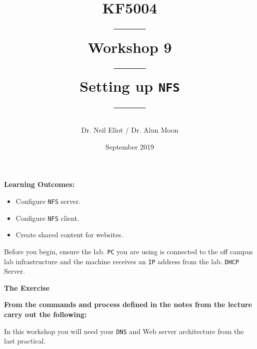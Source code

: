 \documentclass[11pt]{article}
\begin{document}
\author{Dr. Neil Eliot / Dr. Alun Moon}
\title{KF5004\\------\\Workshop 9\\------\\Setting up \texttt{NFS}\\------}
\date{September 2019}
\maketitle

\newpage



\noindent\textbf{Learning Outcomes:}
\begin{itemize}
    \item Configure \texttt{NFS} server.
    \item Configure \texttt{NFS} client.
    \item Create shared content for websites.
\end{itemize}


\begin{tcolorbox}[title={\textbf{Important:}}]
    Before you begin, ensure the lab. \texttt{PC} you are using is connected to the off campus lab infrastructure and the machine receives an \texttt{IP} address from the lab. \texttt{DHCP} Server.
\end{tcolorbox}
\newpage

\noindent\textbf{The Exercise}\\
\begin{tcolorbox}[colback=blue!20]
    \noindent\textbf{From the commands and process defined in the notes from the lecture carry out the following:}
\end{tcolorbox}


\begin{tcolorbox}[title={\textbf{NOTE:}}]
    In this workshop you will need your \texttt{DNS} and Web server architecture from the last practical.
\end{tcolorbox}
\end{document}
